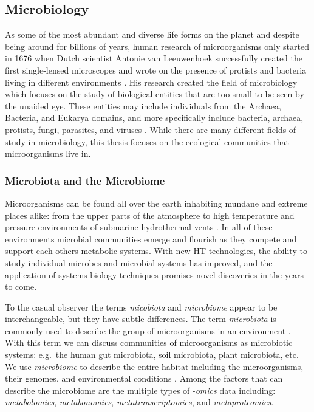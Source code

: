 \subsection{Microbiology}\label{intro-micro}
As some of the most abundant and diverse life forms on the planet and despite being around for billions of years, human research of microorganisms only started in 1676 when Dutch scientist Antonie van Leeuwenhoek successfully created the first single-lensed microscopes and wrote on the presence of protists and bacteria living in different environments \citep{Lane2015}. His research created the field of microbiology which focuses on the study of biological entities that are too small to be seen by the unaided eye. These entities may include individuals from the Archaea, Bacteria, and Eukarya domains, and more specifically include bacteria, archaea, protists, fungi, parasites, and viruses \citep{Sattley2015}. While there are many different fields of study in microbiology, this thesis focuses on the ecological communities that microorganisms live in.

\subsubsection{Microbiota and the Microbiome}\label{intro-microbs}
Microorganisms can be found all over the earth inhabiting mundane and extreme places alike: from the upper parts of the atmosphere \citep{Fulton1966}
to high temperature and pressure environments of submarine hydrothermal vents \citep{Anderson2011}. In all of these environments microbial communities emerge and flourish as they compete and support each others metabolic systems. With new \acrshort{HT} technologies, the ability to study individual microbes and microbial systems has improved, and the application of systems biology techniques promises novel discoveries in the years to come.

To the casual observer the terms \textit{micobiota} and \textit{microbiome} appear to be interchangeable, but they have subtle differences. The term \textit{microbiota} is commonly used to describe the group of microorganisms in an environment \citep{Marchesi2015}. With this term we can discuss communities of microorganisms as microbiotic systems: e.g.\ the human gut microbiota, soil microbiota,  plant microbiota, etc. We use \textit{microbiome} to describe the entire habitat including the microorganisms, their genomes, and environmental conditions \citep{Marchesi2015}. Among the factors that can describe the microbiome are the multiple types of -\textit{omics} data including: \textit{metabolomics}, \textit{metabonomics}, \textit{metatranscriptomics}, and \textit{metaproteomics}.



